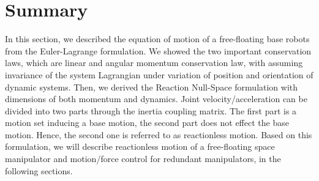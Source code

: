 \section{Summary}
In this section, we described the equation of motion of a free-floating base robots
from the Euler-Lagrange formulation.
We showed the two important conservation laws, which are linear and angular momentum conservation law,
with assuming invariance of the system Lagrangian under variation of position and orientation of dynamic systems.
Then, we derived the Reaction Null-Space formulation with dimensions of both momentum and dynamics.
Joint velocity/acceleration can be divided into two parts through the inertia coupling matrix.
The first part is a motion set inducing a base motion,
the second part does not effect the base motion.
Hence, the second one is referred to as reactionless motion.
Based on this formulation, we will describe reactionless motion of a free-floating space manipulator and
motion/force control for redundant manipulators, in the following sections.



%
%
